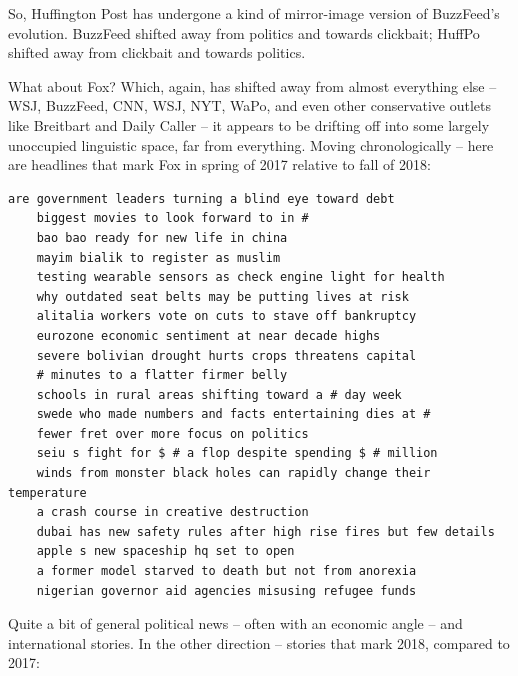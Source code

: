 \documentclass{scrartcl}
\begin{document}
So, Huffington Post has undergone a kind of mirror-image version of BuzzFeed's evolution. BuzzFeed shifted away from politics and towards clickbait; HuffPo shifted away from clickbait and towards politics.

What about Fox? Which, again, has shifted away from almost everything else -- WSJ, BuzzFeed, CNN, WSJ, NYT, WaPo, and even other conservative outlets like Breitbart and Daily Caller -- it appears to be drifting off into some largely unoccupied linguistic space, far from everything. Moving chronologically -- here are headlines that mark Fox in spring of 2017 relative to fall of 2018:

\begin{lstlisting}[basicstyle=\tiny\hlfont]
    are government leaders turning a blind eye toward debt
    biggest movies to look forward to in #
    bao bao ready for new life in china
    mayim bialik to register as muslim
    testing wearable sensors as check engine light for health
    why outdated seat belts may be putting lives at risk
    alitalia workers vote on cuts to stave off bankruptcy
    eurozone economic sentiment at near decade highs
    severe bolivian drought hurts crops threatens capital
    # minutes to a flatter firmer belly
    schools in rural areas shifting toward a # day week
    swede who made numbers and facts entertaining dies at #
    fewer fret over more focus on politics
    seiu s fight for $ # a flop despite spending $ # million
    winds from monster black holes can rapidly change their temperature
    a crash course in creative destruction
    dubai has new safety rules after high rise fires but few details
    apple s new spaceship hq set to open
    a former model starved to death but not from anorexia
    nigerian governor aid agencies misusing refugee funds
\end{lstlisting}

Quite a bit of general political news -- often with an economic angle -- and international stories. In the other direction -- stories that mark 2018, compared to 2017:
\end{document}
